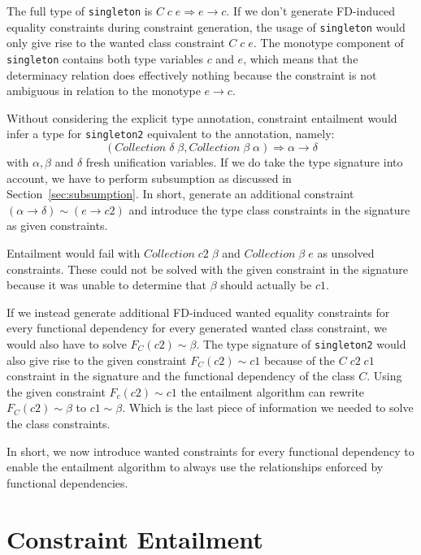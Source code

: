 The full type of \texttt{singleton} is $C \; c \; e \Rightarrow e \rightarrow
c$. If we don't generate FD-induced equality constraints during constraint
generation, the usage of \texttt{singleton} would only give rise to the wanted
class constraint $C \; c \; e$. The monotype component of \texttt{singleton}
contains both type variables $c$ and $e$, which means that the determinacy
relation does effectively nothing because the constraint is not ambiguous in
relation to the monotype $e \rightarrow c$.

Without considering the explicit type annotation, constraint entailment would
infer a type for \texttt{singleton2} equivalent to the annotation, namely:
\[
    (Collection \; \delta \; \beta, Collection \; \beta \; \alpha) \Rightarrow
    \alpha \rightarrow \delta
\]
with $\alpha, \beta$ and $\delta$ fresh unification variables. If we do take the
type signature into account, we have to perform subsumption as discussed in
Section~\ref{sec:subsumption}. In short, generate an additional constraint
$(\alpha \rightarrow \delta) \sim (e \rightarrow c2)$ and introduce the type class
constraints in the signature as given constraints.

Entailment would fail with $Collection \; c2 \; \beta$ and $Collection \; \beta
\; e$ as unsolved constraints. These could not be solved with the given
constraint in the signature because it was unable to determine that $\beta$
should actually be $c1$.

If we instead generate additional FD-induced wanted equality constraints for
every functional dependency for every generated wanted class constraint, we
would also have to solve $F_C(c2) \sim \beta$. The type signature of
\texttt{singleton2} would also give rise to the given constraint $F_C(c2) \sim
c1$ because of the $C \; c2 \; c1$ constraint in the signature and the functional
dependency of the class $C$. Using the given constraint $F_c(c2) \sim c1$ the
entailment algorithm can  rewrite $F_C(c2) \sim \beta$ to $c1 \sim \beta$. Which
is the last piece of information we needed to solve the class constraints.

In short, we now introduce wanted constraints for every functional dependency to
enable the entailment algorithm to always use the relationships enforced by
functional dependencies.

\section{Constraint Entailment}

